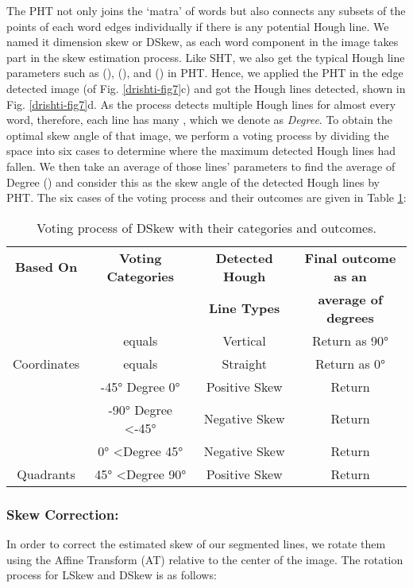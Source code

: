 \documentclass[runningheads]{llncs}
\begin{document}
The PHT not only joins the `matra' of words but also connects any subsets of the points of each word edges individually if there is any potential Hough line. We named it dimension skew or DSkew, as each word component in the image takes part in the skew estimation process. Like SHT, we also get the typical Hough line parameters such as (), (), and () in PHT. Hence, we applied the PHT in the edge detected image (of Fig. \ref{drishti-fig7}c) and got the Hough lines detected, shown in Fig. \ref{drishti-fig7}d. As the process detects multiple Hough lines for almost every word, therefore, each line has many , which we denote as \textit{Degree}. To obtain the optimal skew angle of that image, we perform a voting process by dividing the  space into six cases to determine where the maximum detected Hough lines had fallen. We then take an average of those lines' parameters to find the average of Degree () and consider this as the skew angle of the detected Hough lines by PHT. The six cases of the voting process and their outcomes are given in Table \ref{drishti-tab2}:

\begin{table}[h]
\vspace{-4mm}
\centering
\caption{Voting process of DSkew with their categories and outcomes.}\label{drishti-tab2}
\begin{tabular}{|c|c|c|c|}
\hline
\textbf{Based   On} & \textbf{Voting   Categories} & \textbf{Detected Hough} & \textbf{Final   outcome as an} \\
 &  & \textbf{Line Types} & \textbf{average of degrees} \\ \hline
 &  equals  & Vertical & Return   as  90° \\ \cline{2-4} 
\multirow{-2}{*}{Coordinates} &  equals  & Straight & Return  as 0° \\ \hline
 & -45°    Degree  0° & Positive   Skew & Return    \\ \cline{2-4} 
 & -90°    Degree \textless -45° & Negative   Skew & Return    \\ \cline{2-4} 
 & 0°   \textless Degree  45° & Negative   Skew & Return    \\ \cline{2-4} 
\multirow{-4}{*}{Quadrants} & 45°   \textless Degree  90° & Positive   Skew & Return    \\ \hline
\end{tabular}
\vspace{-8mm}
\end{table}


\subsubsection{Skew Correction:}
In order to correct the estimated skew of our segmented lines, we rotate them using the Affine Transform (AT) relative to the center of the image. The rotation process for LSkew and DSkew is as follows:
\end{document}
